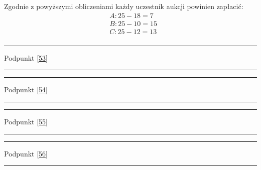 \documentclass[
    12pt, %
]{../fphw}
\begin{document}
Zgodnie z powyższymi obliczeniami każdy uczestnik aukcji powinien zapłacić:
\begin{align*}
     & A: 25 -  18 = 7 \\
     & B: 25 -  10 = 15 \\
     & C: 25 -  12= 13 \\
\end{align*}
\par\noindent\rule{\textwidth}{0.4pt}
Podpunkt \ref{53}
\par\noindent\rule{\textwidth}{0.4pt}

\par\noindent\rule{\textwidth}{0.4pt}
Podpunkt \ref{54}
\par\noindent\rule{\textwidth}{0.4pt}

\par\noindent\rule{\textwidth}{0.4pt}
Podpunkt \ref{55}
\par\noindent\rule{\textwidth}{0.4pt}

\par\noindent\rule{\textwidth}{0.4pt}
Podpunkt \ref{56}
\par\noindent\rule{\textwidth}{0.4pt}


\newpage
\lstlistoflistings
\listoffigures
\listoftables
\end{document}
